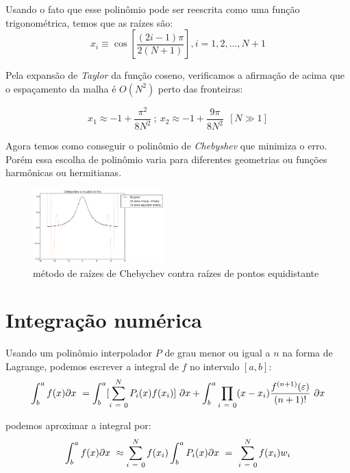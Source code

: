  Usando o fato que esse polinômio pode ser reescrita como uma função trigonométrica, temos que as raízes são:
 \begin{equation}
  x_i  \equiv \cos \left [ \frac{(2i - 1)\pi}{2(N+1)}  \right ] , i = 1,2,..., N+1
 \end{equation}
 
 Pela expansão de \emph{Taylor} da função coseno, verificamos a afirmação de acima que o espaçamento da malha é $O(N^2)$ perto das fronteiras:
 
 \begin{equation}
  x_1 \approx -1 + \frac{\pi^2}{8N^2}\ ;\ x_2 \approx -1 + \frac{9\pi}{8N^2}\ \ [N\gg 1]
 \end{equation}
 
 Agora temos como conseguir o polinômio de \emph{Chebyshev} que minimiza o erro. Porém essa escolha de polinômio varia para diferentes geometrias ou funções harmônicas ou hermitianas.
 \begin{figure}[t]
 \includegraphics[width=0.45\textwidth, center]{figuras/chebychev_equidist.png}
 \caption{método de raízes de Chebychev contra raízes de pontos equidistante}
 \end{figure}
\pagebreak
\section{Integração numérica}
 Usando um polinômio interpolador $P$ de grau menor ou igual a $n$ na forma de Lagrange, podemos escrever a integral de $f$ no intervalo $[a,b]$:\\
 
\begin{equation}
\int^{a}_b f(x) \partial x\ = \int^{a}_b[\sum_{i\ =\ 0}^N P_i(x) f(x_i)]\ \partial x +  \int^{a}_b \prod_{i\ =\ 0} (x - x_i)\frac{f^{(n+1)}(\varepsilon)}{(n+1)!}\ \partial x\\
\end{equation}

podemos aproximar a integral por:
\begin{equation}
   \int^{a}_b f(x) \partial x\ \approx \sum_{i\ =\ 0}^N f(x_i) \int^{a}_b P_i(x) \partial x\ =\ \sum_{i\ =\ 0}^N f(x_i) w_i \\
\end{equation}

